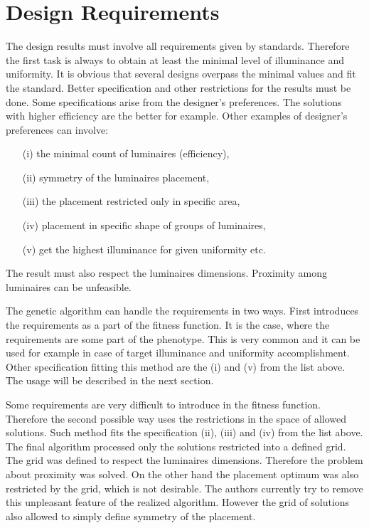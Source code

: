 \section{Design Requirements}
The design results must involve all requirements given by standards. Therefore the first task is always to obtain at least the minimal level of illuminance and uniformity. It is obvious that several designs overpass the minimal values and fit the standard. Better specification and other restrictions for the results must be done. Some specifications arise from the designer's preferences. The solutions with higher efficiency are the better for example. Other examples of designer's preferences can involve:

\begin{enumerate}
	\item[(i)] the minimal count of luminaires (efficiency),
	\item[(ii)] symmetry of the luminaires placement,
	\item[(iii)] the placement restricted only in specific area,
	\item[(iv)] placement in specific shape of groups of luminaires,
	\item[(v)] get the highest illuminance for given uniformity etc.
\end{enumerate}

The result must also respect the luminaires dimensions. Proximity among luminaires can be unfeasible.

The genetic algorithm can handle the requirements in two ways. First introduces the requirements as a part of the fitness function. It is the case, where the requirements are some part of the phenotype. This is very common and it can be used for example in case of target illuminance and uniformity accomplishment. Other specification fitting this method are the (i) and (v) from the list above. The usage will be described in the next section. 

Some requirements are very difficult to introduce in the fitness function. Therefore the second possible way uses the restrictions in the space of allowed solutions. Such method fits the specification (ii), (iii) and (iv) from the list above. The final algorithm processed only the solutions restricted into a defined grid. The grid was defined to respect the luminaires dimensions. Therefore the problem about proximity was solved. On the other hand the placement optimum was also restricted by the grid, which is not desirable. The authors currently try to remove this unpleasant feature of the realized algorithm. However the grid of solutions also allowed to simply define symmetry of the placement.

